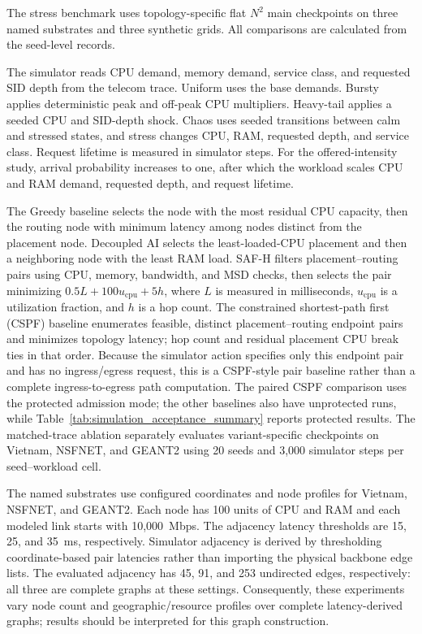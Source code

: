 \documentclass[final,5p]{elsarticle}
\newcommand{\rev}[1]{\textcolor{revisiongreen}{#1}}
\let\newrev\rev
\begin{document}
\newrev{The stress benchmark uses topology-specific flat \(N^2\) main checkpoints on three named substrates and three synthetic grids. All comparisons are calculated from the seed-level records.}

\newrev{The simulator reads CPU demand, memory demand, service class, and requested SID depth from the telecom trace. Uniform uses the base demands. Bursty applies deterministic peak and off-peak CPU multipliers. Heavy-tail applies a seeded CPU and SID-depth shock. Chaos uses seeded transitions between calm and stressed states, and stress changes CPU, RAM, requested depth, and service class. Request lifetime is measured in simulator steps. For the offered-intensity study, arrival probability increases to one, after which the workload scales CPU and RAM demand, requested depth, and request lifetime.}

\newrev{The Greedy baseline selects the node with the most residual CPU capacity, then the routing node with minimum latency among nodes distinct from the placement node. Decoupled AI selects the least-loaded-CPU placement and then a neighboring node with the least RAM load. SAF-H filters placement--routing pairs using CPU, memory, bandwidth, and MSD checks, then selects the pair minimizing \(0.5L+100u_{\mathrm{cpu}}+5h\), where \(L\) is measured in milliseconds, \(u_{\mathrm{cpu}}\) is a utilization fraction, and \(h\) is a hop count. The constrained shortest-path first (CSPF) baseline enumerates feasible, distinct placement--routing endpoint pairs and minimizes topology latency; hop count and residual placement CPU break ties in that order. Because the simulator action specifies only this endpoint pair and has no ingress/egress request, this is a CSPF-style pair baseline rather than a complete ingress-to-egress path computation. The paired CSPF comparison uses the protected admission mode; the other baselines also have unprotected runs, while Table~\ref{tab:simulation_acceptance_summary} reports protected results. The matched-trace ablation separately evaluates variant-specific checkpoints on Vietnam, NSFNET, and GEANT2 using 20 seeds and 3,000 simulator steps per seed--workload cell.}

\newrev{The named substrates use configured coordinates and node profiles for Vietnam, NSFNET, and GEANT2. Each node has 100 units of CPU and RAM and each modeled link starts with 10,000~Mbps. The adjacency latency thresholds are 15, 25, and 35~ms, respectively. Simulator adjacency is derived by thresholding coordinate-based pair latencies rather than importing the physical backbone edge lists. The evaluated adjacency has 45, 91, and 253 undirected edges, respectively: all three are complete graphs at these settings. Consequently, these experiments vary node count and geographic/resource profiles over complete latency-derived graphs; results should be interpreted for this graph construction.}
\end{document}
